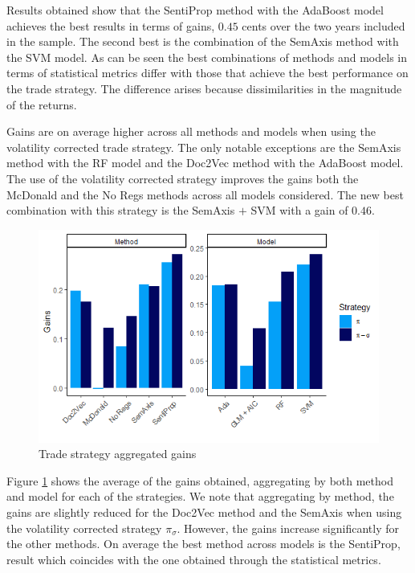 \documentclass[a4paper, 12pt]{report}
\begin{document}
    Results obtained show that the SentiProp method with the AdaBoost model achieves the best results in terms of gains, $0.45$ cents over the two years included in the sample. The second best is the combination of the SemAxis method with the SVM model. As can be seen the best combinations of methods and models in terms of statistical metrics differ with those that achieve the best performance on the trade strategy. The difference arises because dissimilarities in the magnitude of the returns.  

    Gains are on average higher across all methods and models when using the volatility corrected trade strategy. The only notable exceptions are the SemAxis method with the RF model and the Doc2Vec method with the AdaBoost model. The use of the volatility corrected strategy improves the gains both the McDonald and the No Regs methods across all models considered. The new best combination with this strategy is the SemAxis $+$ SVM with a gain of $0.46$. 
    
    \begin{figure}[H]
    \centering
    \includegraphics[width=15cm]{graphs/TradeAgg.png}
    \caption{Trade strategy aggregated gains}
    \label{Fig:TradeAgg}
    \end{figure}
    
    Figure \ref{Fig:TradeAgg} shows the average of the gains obtained, aggregating by both method and model for each of the strategies. We note that aggregating by method, the gains are slightly reduced for the Doc2Vec method and the SemAxis when using the volatility corrected strategy $\pi_\sigma$. However, the gains increase significantly for the other methods. On average the best method across models is the SentiProp, result which coincides with the one obtained through the statistical metrics. 
    
\end{document}
